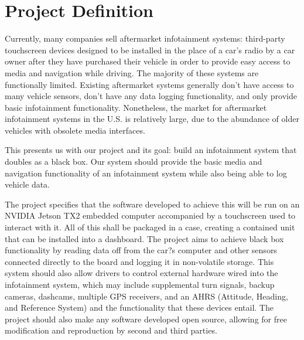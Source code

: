 \documentclass[onecolumn, draftclsnofoot,10pt, compsoc]{IEEEtran}
\begin{document}
\newpage
{}
\tableofcontents
\clearpage

\section{Project Definition}
Currently, many companies sell aftermarket infotainment systems: third-party touchscreen devices designed to be installed in the place of a car's radio by a car owner after they have purchased their vehicle in order to provide easy access to media and navigation while driving. The majority of these systems are functionally limited. Existing aftermarket systems generally don't have access to many vehicle sensors, don't have any data logging functionality, and only provide basic infotainment functionality. Nonetheless, the market for aftermarket infotainment systems in the U.S. is relatively large, due to the abundance of older vehicles with obsolete media interfaces.\par

This presents us with our project and its goal: build an infotainment system that doubles as a black box. Our system should provide the basic media and navigation functionality of an infotainment system while also being able to log vehicle data.\par

The project specifies that the software developed to achieve this will be run on an NVIDIA Jetson TX2 embedded computer accompanied by a touchscreen used to interact with it. All of this shall be packaged in a case, creating a contained unit that can be installed into a dashboard. The project aims to achieve black box functionality by reading data off from the car?s computer and other sensors connected directly to the board and logging it in non-volatile storage. This system should also allow drivers to control external hardware wired into the infotainment system, which may include supplemental turn signals, backup cameras, dashcams, multiple GPS receivers, and an AHRS (Attitude, Heading, and Reference System) and the functionality that these devices entail. The project should also make any software developed open source, allowing for free modification and reproduction by second and third parties.\par
\end{document}
